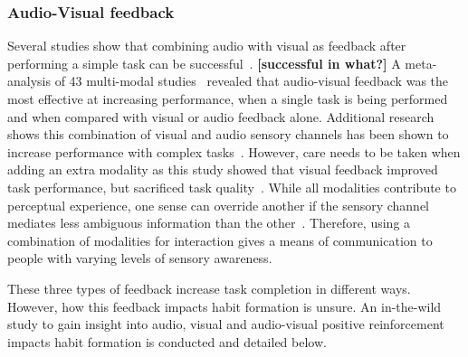 \documentclass{scaffold/sigchi}
\begin{document}
\subsubsection{Audio-Visual feedback}
Several studies show that combining audio with visual as feedback after performing a simple task can be successful~\cite{benefits_of_audio_visual_1, benefits_of_audio_visual_2}. 
%
\textbf{[successful in what?]}
%
A meta-analysis of 43 multi-modal studies~\cite{comparing_modalities_effects_of_visual_auditory} revealed that audio-visual feedback was the most effective at increasing performance, when a single task is being performed and when compared with visual or audio feedback alone. Additional research shows this combination of visual and audio sensory channels has been shown to increase performance with complex tasks~\cite{chi_oussama_tap_the_shapetones}. However, care needs to be taken when adding an extra modality as this study showed that visual feedback improved task performance, but sacrificed task quality~\cite{comparing_modalities_effects_of_visual_auditory}. While all modalities contribute to perceptual experience, one sense can override another if the sensory channel mediates less ambiguous information than the other~\cite{one_mode_override_another}. Therefore, using a combination of modalities for interaction gives a means of communication to people with varying levels of sensory awareness.


These three types of feedback increase task completion in different ways. However, how this feedback impacts habit formation is unsure. An in-the-wild study to gain insight into audio, visual and audio-visual positive reinforcement impacts habit formation is conducted and detailed below.
\end{document}
